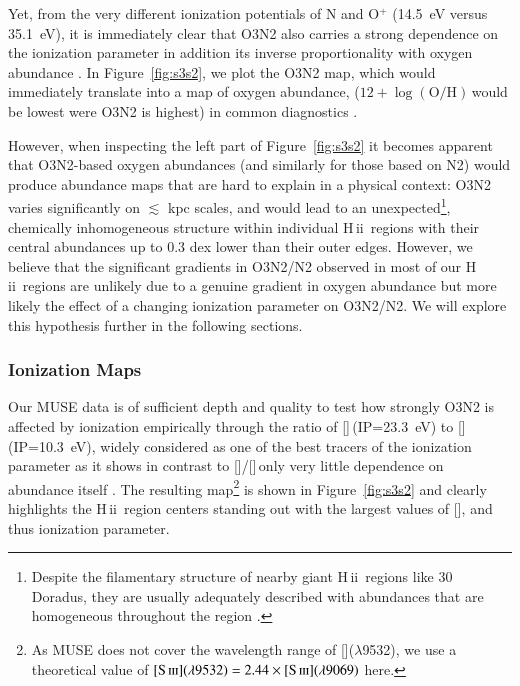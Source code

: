 \documentclass[traditabstract]{aa}
\newcommand{\hii}{\mbox{H\,{\sc ii}}}
\newcommand{\oh}{$12+\log(\mathrm{O/H})$}
\newcommand{\sii}{[\ion{S}{ii}]}
\newcommand{\siii}{[\ion{S}{iii}]}
\newcommand{\oii}{[\ion{O}{ii}]}
\newcommand{\oiii}{[\ion{O}{iii}]}
\begin{document}
Yet, from the very different ionization potentials of N and O$^{+}$ (14.5~eV versus 35.1~eV), it is immediately clear that O3N2 also carries a strong dependence on the ionization parameter in addition its inverse proportionality with oxygen abundance \citep[e.g.][]{1979A&A....78..200A, 2015MNRAS.448.2030H}. In Figure~\ref{fig:s3s2}, we plot the O3N2 map, which would immediately translate into a map of oxygen abundance, (\oh\,would be lowest were O3N2 is highest) in common diagnostics \citep{2004MNRAS.348L..59P}.

However, when inspecting the left part of Figure~\ref{fig:s3s2} it becomes apparent that O3N2-based oxygen abundances  (and similarly for those based on N2) would produce abundance maps that are hard to explain in a physical context: O3N2 varies significantly on $\lesssim$ kpc scales, and would lead to an unexpected\footnote{Despite the filamentary structure of nearby giant \hii~regions like 30 Doradus, they are usually adequately described with abundances that are homogeneous throughout the region \citep[e.g.][and references therein]{2011ApJ...738...34P}.}, chemically inhomogeneous structure within individual \hii~regions with their central abundances up to 0.3 dex lower than their outer edges. However, we believe that the significant gradients in O3N2/N2 observed in most of our \hii~regions are unlikely due to a genuine gradient in oxygen abundance but more likely the effect of a changing ionization parameter on O3N2/N2. We will explore this hypothesis further in the following sections.

\subsubsection{Ionization Maps}

Our MUSE data is of sufficient depth and quality to test how strongly O3N2 is affected by ionization empirically through the ratio of \siii\,(IP=23.3~eV) to \sii\,(IP=10.3~eV), widely considered as one of the best tracers of the ionization parameter \citep{1991MNRAS.253..245D} as it shows in contrast to \oiii/\oii\,only very little dependence on abundance itself \citep{2002ApJS..142...35K, 2011MNRAS.415.3616D}. The resulting map\footnote{As MUSE does not cover the wavelength range of \siii($\lambda$9532), we use a theoretical value of $\siii(\lambda9532)=2.44\times\siii(\lambda9069)$ \citep{1982MNRAS.199.1025M} here.} is shown in Figure~\ref{fig:s3s2} and clearly highlights the \hii~region centers standing out with the largest values of \siii, and thus ionization parameter. 
\end{document}
